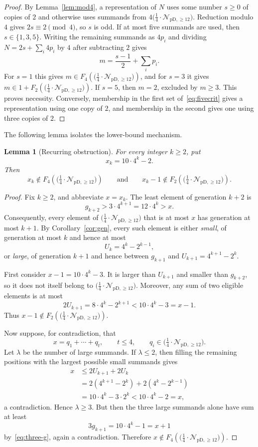 \documentclass[12pt]{article}
\theoremstyle{plain}
\newtheorem{lemma}[theorem]{Lemma}
\theoremstyle{definition}
\theoremstyle{plain}
\newcommand{\Pset}{%
  \bigl(\tfrac{1}{4}\cdot\mathcal{N}_{\mathrm{pD},\geq 12}\bigr)%
}
\begin{document}
\begin{proof}
By Lemma~\ref{lem:mod4}, a representation of $N$ uses some number $s\geq0$ of
copies of $2$ and otherwise uses summands from $4\Pset$.  Reduction modulo $4$
gives $2s\equiv2\pmod4$, so $s$ is odd.  If at most five summands are used,
then $s\in\{1,3,5\}$.  Writing the remaining summands as $4p_i$ and dividing
$N=2s+\sum_i4p_i$ by $4$ after subtracting $2$ gives
\[
  m=\frac{s-1}{2}+\sum_i p_i.
\]
For $s=1$ this gives $m\in F_4(\Pset)$, and for $s=3$ it gives
$m\in1+F_2(\Pset)$.  If $s=5$, then $m=2$, excluded by $m\geq3$.  This proves
necessity.  Conversely, membership in the first set of~\eqref{eq:fivecrit}
gives a representation using one copy of $2$, and membership in the second
gives one using three copies of $2$.
\end{proof}

The following lemma isolates the lower-bound mechanism.

\begin{lemma}[Recurring obstruction]\label{lem:obstruction}
For every integer $k\geq2$, put
\[
  x_k=10\cdot4^k-2.
\]
Then
\begin{equation}\label{eq:obstruction}
  x_k\notin F_4(\Pset)
  \qquad\text{and}\qquad
  x_k-1\notin F_2(\Pset).
\end{equation}
\end{lemma}

\begin{proof}
Fix $k\geq2$, and abbreviate $x=x_k$.  The least element of generation $k+2$
is
\[
  g_{k+2}>3\cdot4^{k+1}=12\cdot4^k>x.
\]
Consequently, every element of $\Pset$ that is at most $x$ has generation at
most $k+1$.  By Corollary~\ref{cor:gen}, every such element is either
\emph{small}, of generation at most $k$ and hence at most
\[
  U_k=4^k-2^{k-1},
\]
or \emph{large}, of generation $k+1$ and hence between $g_{k+1}$ and
$U_{k+1}=4^{k+1}-2^k$.

First consider $x-1=10\cdot4^k-3$.  It is larger than $U_{k+1}$ and smaller
than $g_{k+2}$, so it does not itself belong to $\Pset$.  Moreover, any sum of
two eligible elements is at most
\[
  2U_{k+1}=8\cdot4^k-2^{k+1}<10\cdot4^k-3=x-1.
\]
Thus $x-1\notin F_2(\Pset)$.

Now suppose, for contradiction, that
\[
  x=q_1+\cdots+q_t,\qquad t\leq4,\qquad q_i\in\Pset.
\]
Let $\lambda$ be the number of large summands.  If $\lambda\leq2$, then filling
the remaining positions with the largest possible small summands gives
\begin{align*}
  x
  &\leq2U_{k+1}+2U_k\\
  &=2(4^{k+1}-2^k)+2(4^k-2^{k-1})\\
  &=10\cdot4^k-3\cdot2^k
  <10\cdot4^k-2=x,
\end{align*}
a contradiction.  Hence $\lambda\geq3$.  But then the three large summands
alone have sum at least
\[
  3g_{k+1}=10\cdot4^k-1=x+1
\]
by~\eqref{eq:three-g}, again a contradiction.  Therefore
$x\notin F_4(\Pset)$.
\end{proof}
\end{document}
